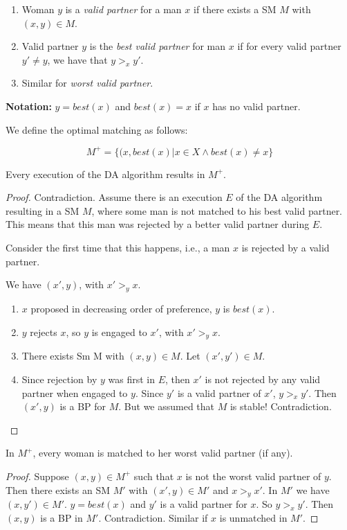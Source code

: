 \begin{enumerate}

\item Woman $y$ is a \emph{valid partner} for a man $x$ if there exists a SM $M$ with $(x,y) \in M$.

\item Valid partner $y$ is the \emph{best valid partner} for man $x$ if for every valid partner $y' \neq y$, we have that $y >_x y'$.

\item Similar for \emph{worst valid partner}.
\end{enumerate}

\textbf{Notation:} $y = best(x)$ and $best(x) = x$ if $x$ has no valid partner.

We define the optimal matching as follows:

$$M^+ = \{ (x, best(x) | x \in X \wedge best(x) \neq x\}$$

\begin{theorem}
Every execution of the DA algorithm results in $M^+$.
\end{theorem}
\begin{proof}
Contradiction. Assume there is an execution $E$ of the DA algorithm resulting in a SM $M$, where some man is not matched to his best valid partner. This means that this man was rejected by a better valid partner during $E$.

Consider the first time that this happens, i.e., a man $x$ is rejected by a valid partner.

We have $(x',y)$, with $x' >_y x$.

\begin{enumerate}
\item $x$ proposed in decreasing order of preference, $y$ is ${best}(x)$.
\item $y$ rejects $x$, so $y$ is engaged to $x'$, with $x' >_y x$.
\item There exists Sm M with $(x,y) \in M$. Let $(x', y') \in M$.
\item Since rejection by $y$ was first in $E$, then $x'$ is not rejected by any valid partner when engaged to $y$. Since $y'$ is a valid partner of $x'$, $y >_x y'$. Then $(x', y)$ is a BP for $M$. But we assumed that $M$ is stable! Contradiction.
\end{enumerate}
\end{proof}

\begin{theorem}
In $M^+$, every woman is matched to her worst valid partner (if any).
\end{theorem}
\begin{proof}
Suppose $(x,y) \in M^+$ such that $x$ is not the worst valid partner of $y$.
Then there exists an SM $M'$ with $(x', y) \in M'$ and $x >_y x'$.
In $M'$ we have $(x, y') \in M'$. $y = {best}(x)$ and $y'$ is a valid partner for $x$. So $y >_x y'$. Then $(x,y)$ is a BP in $M'$. Contradiction.
Similar if $x$ is unmatched in $M'$.
\end{proof}